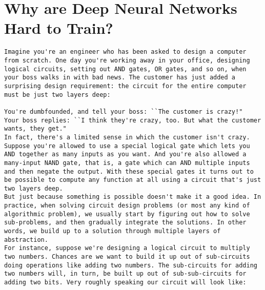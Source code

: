 
\chapter{Why are Deep Neural Networks Hard to Train?}
\label{sec:WhyAreDeepNeuralNetworksHardToTrain?}





\begin{lstlisting}
Imagine you're an engineer who has been asked to design a computer from scratch. One day you're working away in your office, designing logical circuits, setting out AND gates, OR gates, and so on, when your boss walks in with bad news. The customer has just added a surprising design requirement: the circuit for the entire computer must be just two layers deep:

You're dumbfounded, and tell your boss: ``The customer is crazy!"
Your boss replies: ``I think they're crazy, too. But what the customer wants, they get."
In fact, there's a limited sense in which the customer isn't crazy. Suppose you're allowed to use a special logical gate which lets you AND together as many inputs as you want. And you're also allowed a many-input NAND gate, that is, a gate which can AND multiple inputs and then negate the output. With these special gates it turns out to be possible to compute any function at all using a circuit that's just two layers deep.
But just because something is possible doesn't make it a good idea. In practice, when solving circuit design problems (or most any kind of algorithmic problem), we usually start by figuring out how to solve sub-problems, and then gradually integrate the solutions. In other words, we build up to a solution through multiple layers of abstraction. 
For instance, suppose we're designing a logical circuit to multiply two numbers. Chances are we want to build it up out of sub-circuits doing operations like adding two numbers. The sub-circuits for adding two numbers will, in turn, be built up out of sub-sub-circuits for adding two bits. Very roughly speaking our circuit will look like:


\end{lstlisting}
